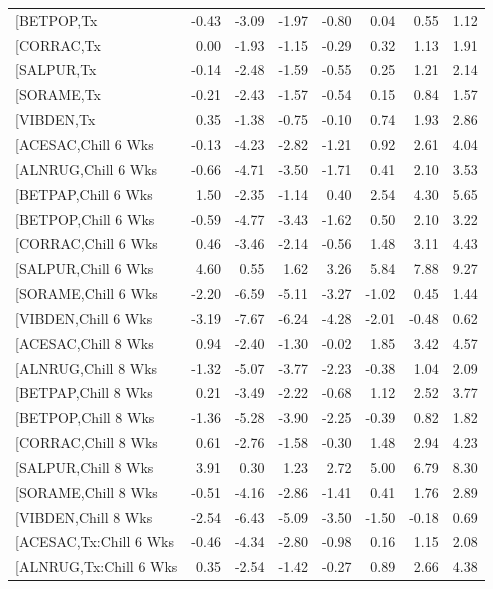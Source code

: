 \documentclass{article}\usepackage[]{graphicx}\usepackage[]{color}
\begin{document}
\begin{longtable}{lrrrrrrr}
  [BETPOP,Tx & -0.43 & -3.09 & -1.97 & -0.80 & 0.04 & 0.55 & 1.12 \\ 
  [CORRAC,Tx & 0.00 & -1.93 & -1.15 & -0.29 & 0.32 & 1.13 & 1.91 \\ 
  [SALPUR,Tx & -0.14 & -2.48 & -1.59 & -0.55 & 0.25 & 1.21 & 2.14 \\ 
  [SORAME,Tx & -0.21 & -2.43 & -1.57 & -0.54 & 0.15 & 0.84 & 1.57 \\ 
  [VIBDEN,Tx & 0.35 & -1.38 & -0.75 & -0.10 & 0.74 & 1.93 & 2.86 \\ 
  [ACESAC,Chill 6 Wks & -0.13 & -4.23 & -2.82 & -1.21 & 0.92 & 2.61 & 4.04 \\ 
  [ALNRUG,Chill 6 Wks & -0.66 & -4.71 & -3.50 & -1.71 & 0.41 & 2.10 & 3.53 \\ 
  [BETPAP,Chill 6 Wks & 1.50 & -2.35 & -1.14 & 0.40 & 2.54 & 4.30 & 5.65 \\ 
  [BETPOP,Chill 6 Wks & -0.59 & -4.77 & -3.43 & -1.62 & 0.50 & 2.10 & 3.22 \\ 
  [CORRAC,Chill 6 Wks & 0.46 & -3.46 & -2.14 & -0.56 & 1.48 & 3.11 & 4.43 \\ 
  [SALPUR,Chill 6 Wks & 4.60 & 0.55 & 1.62 & 3.26 & 5.84 & 7.88 & 9.27 \\ 
  [SORAME,Chill 6 Wks & -2.20 & -6.59 & -5.11 & -3.27 & -1.02 & 0.45 & 1.44 \\ 
  [VIBDEN,Chill 6 Wks & -3.19 & -7.67 & -6.24 & -4.28 & -2.01 & -0.48 & 0.62 \\ 
  [ACESAC,Chill 8 Wks & 0.94 & -2.40 & -1.30 & -0.02 & 1.85 & 3.42 & 4.57 \\ 
  [ALNRUG,Chill 8 Wks & -1.32 & -5.07 & -3.77 & -2.23 & -0.38 & 1.04 & 2.09 \\ 
  [BETPAP,Chill 8 Wks & 0.21 & -3.49 & -2.22 & -0.68 & 1.12 & 2.52 & 3.77 \\ 
  [BETPOP,Chill 8 Wks & -1.36 & -5.28 & -3.90 & -2.25 & -0.39 & 0.82 & 1.82 \\ 
  [CORRAC,Chill 8 Wks & 0.61 & -2.76 & -1.58 & -0.30 & 1.48 & 2.94 & 4.23 \\ 
  [SALPUR,Chill 8 Wks & 3.91 & 0.30 & 1.23 & 2.72 & 5.00 & 6.79 & 8.30 \\ 
  [SORAME,Chill 8 Wks & -0.51 & -4.16 & -2.86 & -1.41 & 0.41 & 1.76 & 2.89 \\ 
  [VIBDEN,Chill 8 Wks & -2.54 & -6.43 & -5.09 & -3.50 & -1.50 & -0.18 & 0.69 \\ 
  [ACESAC,Tx:Chill 6 Wks & -0.46 & -4.34 & -2.80 & -0.98 & 0.16 & 1.15 & 2.08 \\ 
  [ALNRUG,Tx:Chill 6 Wks & 0.35 & -2.54 & -1.42 & -0.27 & 0.89 & 2.66 & 4.38 \\ 

\end{longtable}
\end{document}

